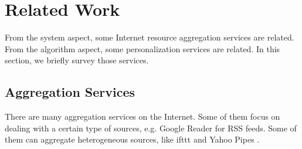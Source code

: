\documentclass{sig-alternate}
\begin{document}

\section{Related Work}
\label{sec:Related Work}

From the system aspect, some Internet resource aggregation services are related. 
From the algorithm aspect, some personalization services are related. 
In this section, we briefly survey those services. 

\subsection{Aggregation Services}
\label{sec:Aggregation Services}

There are many aggregation services on the Internet. 
Some of them focus on dealing with a certain type of sources, 
e.g. Google Reader for RSS feeds. 
Some of them can aggregate heterogeneous sources, 
like ifttt \cite{ifttt} and Yahoo Pipes \cite{yahoo_pipes}. 
\end{document}
